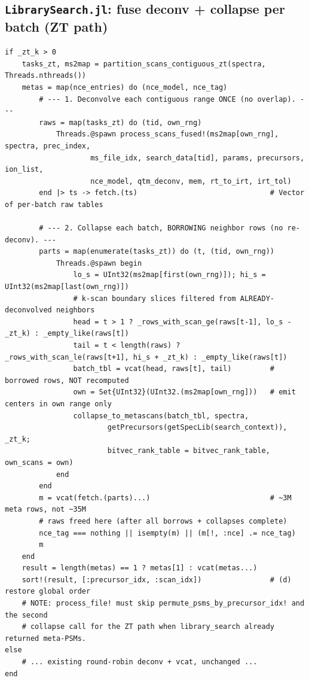 \documentclass[11pt]{article}
\newcommand{\code}[1]{\texttt{\small #1}}
\begin{document}
\subsection{\code{LibrarySearch.jl}: fuse deconv + collapse per batch (ZT path)}
\begin{lstlisting}
if _zt_k > 0
    tasks_zt, ms2map = partition_scans_contiguous_zt(spectra, Threads.nthreads())
    metas = map(nce_entries) do (nce_model, nce_tag)
        # --- 1. Deconvolve each contiguous range ONCE (no overlap). ---
        raws = map(tasks_zt) do (tid, own_rng)
            Threads.@spawn process_scans_fused!(ms2map[own_rng], spectra, prec_index,
                    ms_file_idx, search_data[tid], params, precursors, ion_list,
                    nce_model, qtm_deconv, mem, rt_to_irt, irt_tol)
        end |> ts -> fetch.(ts)                               # Vector of per-batch raw tables

        # --- 2. Collapse each batch, BORROWING neighbor rows (no re-deconv). ---
        parts = map(enumerate(tasks_zt)) do (t, (tid, own_rng))
            Threads.@spawn begin
                lo_s = UInt32(ms2map[first(own_rng)]); hi_s = UInt32(ms2map[last(own_rng)])
                # k-scan boundary slices filtered from ALREADY-deconvolved neighbors
                head = t > 1 ? _rows_with_scan_ge(raws[t-1], lo_s - _zt_k) : _empty_like(raws[t])
                tail = t < length(raws) ? _rows_with_scan_le(raws[t+1], hi_s + _zt_k) : _empty_like(raws[t])
                batch_tbl = vcat(head, raws[t], tail)         # borrowed rows, NOT recomputed
                own = Set{UInt32}(UInt32.(ms2map[own_rng]))   # emit centers in own range only
                collapse_to_metascans(batch_tbl, spectra,
                        getPrecursors(getSpecLib(search_context)), _zt_k;
                        bitvec_rank_table = bitvec_rank_table, own_scans = own)
            end
        end
        m = vcat(fetch.(parts)...)                            # ~3M meta rows, not ~35M
        # raws freed here (after all borrows + collapses complete)
        nce_tag === nothing || isempty(m) || (m[!, :nce] .= nce_tag)
        m
    end
    result = length(metas) == 1 ? metas[1] : vcat(metas...)
    sort!(result, [:precursor_idx, :scan_idx])                # (d) restore global order
    # NOTE: process_file! must skip permute_psms_by_precursor_idx! and the second
    # collapse call for the ZT path when library_search already returned meta-PSMs.
else
    # ... existing round-robin deconv + vcat, unchanged ...
end
\end{lstlisting}
\end{document}
